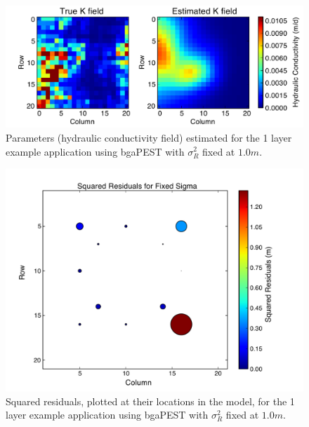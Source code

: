 \documentclass[11pt,oneside,onecolumn]{usgsreport}
\begin{document}
\begin{appendix}
\begin{bibunit}
\begin{figure}[!t]
\begin{center} \includegraphics[scale=0.7]{figures/1_lay_best_pars_sigma_fixed}\end{center}

\caption{\label{fig:KL1-sigfixed}Parameters (hydraulic conductivity field)
estimated for the 1 layer example application using bgaPEST with $\sigma_{R}^{2}$
fixed at $1.0m$.}
\end{figure}


\begin{figure}[!t]
\begin{center} \includegraphics[scale=0.4]{figures/1_layer_fixed_sigma_residuals}\end{center}

\caption{\label{fig:residL1-sigfixed}Squared residuals, plotted at their locations
in the model, for the 1 layer example application using bgaPEST with
$\sigma_{R}^{2}$ fixed at $1.0m$.}
\end{figure}



\end{bibunit}
\end{appendix}
\end{document}
